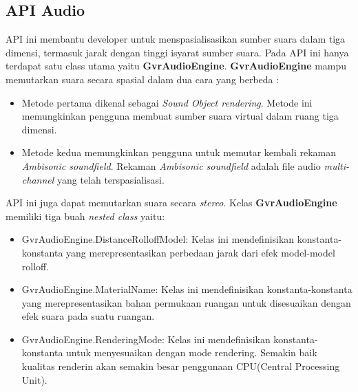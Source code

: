 \subsection{API Audio}
\label{sec:api_audio}
\cite{google_vr_developers}
API ini membantu developer untuk menspasialisasikan sumber suara dalam tiga dimensi, termasuk jarak dengan tinggi isyarat sumber suara. Pada API ini hanya terdapat satu class utama yaitu \textbf{GvrAudioEngine}. \textbf{GvrAudioEngine} mampu memutarkan suara secara spasial dalam dua cara yang berbeda :
\begin{itemize}
	\item Metode pertama dikenal sebagai \textit{Sound Object rendering}. Metode ini memungkinkan pengguna membuat sumber suara virtual dalam ruang tiga dimensi.
	\item Metode kedua memungkinkan pengguna untuk memutar kembali rekaman \textit{Ambisonic soundfield}. Rekaman \textit{Ambisonic soundfield} adalah file audio \textit{multi-channel} yang telah terspasialisasi.
\end{itemize}
API ini juga dapat memutarkan suara secara \textit{stereo}. Kelas \textbf{GvrAudioEngine} memiliki tiga buah \textit{nested class} yaitu:
\begin{itemize}
	\item GvrAudioEngine.DistanceRolloffModel: Kelas ini mendefinisikan konstanta-konstanta yang merepresentasikan perbedaan jarak dari efek model-model rolloff. 
	\item GvrAudioEngine.MaterialName: Kelas ini mendefinisikan konstanta-konstanta yang merepresentasikan bahan permukaan ruangan untuk disesuaikan dengan efek suara pada suatu ruangan.
	\item GvrAudioEngine.RenderingMode: Kelas ini mendefinisikan konstanta-konstanta untuk menyesuaikan dengan mode rendering. Semakin baik kualitas renderin akan semakin besar penggunaan CPU(Central Processing Unit).
\end{itemize}

